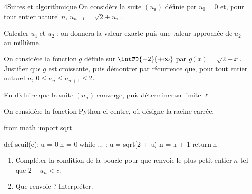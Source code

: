 \begin{exoBac}{4}{Suites et algorithmique}
On considère la suite $(u_n)$ définie par $u_0=0$ et, pour tout entier naturel $n$, $u_{n+1}=\sqrt{2+u_n}$.
\begin{questions}
  \item Calculer $u_1$ et $u_2$ ; on donnera la valeur exacte puis une valeur approchée de $u_2$ au millième.
  \item On considère la fonction $g$ définie sur $\intFO{-2}{+\infty}$ par $g(x)=\sqrt{2+x}$. Justifier que $g$ est croissante, puis
    démontrer par récurrence que, pour tout entier naturel $n$, $0\leq u_n\leq u_{n+1}\leq2$.
  \item En déduire que la suite $(u_n)$ converge, puis déterminer sa limite $\ell$.
  \item On considère la fonction Python ci-contre, où  désigne la racine carrée.
\begin{codecote}[0.46]
\begin{pythoncol}
from math import sqrt

def seuil(e):
    u = 0
    n = 0
    while ... :
        u = sqrt(2 + u)
        n = n + 1
    return n
\end{pythoncol}
\cote
\begin{enumerate}[label=\alph*),leftmargin=1.4em,itemsep=0.6mm,topsep=0mm]
  \item Compléter la condition de la boucle pour que  renvoie le plus petit entier $n$ tel que $2-u_n<e$.
  \item Que renvoie  ? Interpréter.
\end{enumerate}
\end{codecote}
\end{questions}
\end{exoBac}
